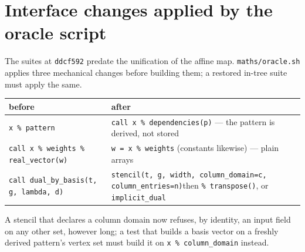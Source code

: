 \documentclass[11pt,a4paper]{article}
\newcommand{\code}[1]{\texttt{#1}}
\begin{document}
\appendix
\section{Interface changes applied by the oracle script}\label{app:api}

The suites at \code{ddcf592} predate the unification of the affine map. \code{maths/oracle.sh} applies three mechanical changes before building them; a restored in-tree suite must apply the same.
\begin{center}\footnotesize
\begin{tabular}{@{}p{5.4cm}p{9.8cm}@{}}
\toprule
before & after \\
\midrule
\code{x \% pattern} & \code{call x \% dependencies(p)} --- the pattern is derived, not stored \\
\code{call x \% weights \% real\_vector(w)} & \code{w = x \% weights} (constants likewise) --- plain arrays \\
\code{call dual\_by\_basis(t, g, lambda, d)} & \code{stencil(t, g, width, column\_domain=c, column\_entries=n)}\newline then \code{\% transpose()}, or \code{implicit\_dual} \\
\bottomrule
\end{tabular}
\end{center}
A stencil that declares a column domain now refuses, by identity, an input field on any other set, however long; a test that builds a basis vector on a freshly derived pattern's vertex set must build it on \code{x \% column\_domain} instead.
\end{document}
